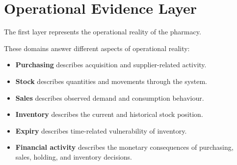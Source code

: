 \documentclass[11pt,a4paper]{article}
\begin{document}
\section{Operational Evidence Layer}

The first layer represents the operational reality of the pharmacy.

\begin{center}
\end{center}

These domains answer different aspects of operational reality:

\begin{itemize}
\item \textbf{Purchasing} describes acquisition and supplier-related activity.
\item \textbf{Stock} describes quantities and movements through the system.
\item \textbf{Sales} describes observed demand and consumption behaviour.
\item \textbf{Inventory} describes the current and historical stock position.
\item \textbf{Expiry} describes time-related vulnerability of inventory.
\item \textbf{Financial activity} describes the monetary consequences of
      purchasing, sales, holding, and inventory decisions.
\end{itemize}
\end{document}
